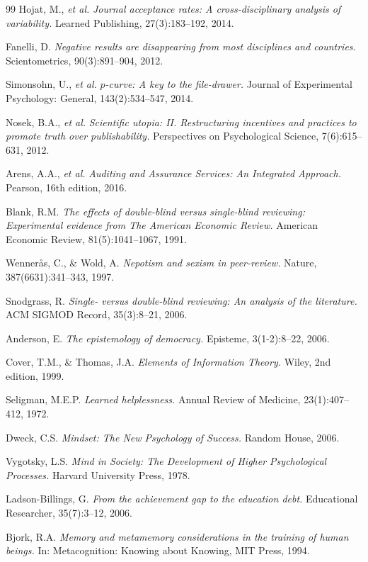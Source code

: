 \documentclass[12pt,a4paper]{article}
\theoremstyle{remark}
\begin{document}
\begin{thebibliography}{99}
Hojat, M., \textit{et al.}
\textit{Journal acceptance rates: A cross-disciplinary analysis of variability.}
Learned Publishing, 27(3):183--192, 2014.

Fanelli, D.
\textit{Negative results are disappearing from most disciplines and countries.}
Scientometrics, 90(3):891--904, 2012.

Simonsohn, U., \textit{et al.}
\textit{$p$-curve: A key to the file-drawer.}
Journal of Experimental Psychology: General, 143(2):534--547, 2014.

Nosek, B.A., \textit{et al.}
\textit{Scientific utopia: II. Restructuring incentives and practices to promote truth over publishability.}
Perspectives on Psychological Science, 7(6):615--631, 2012.

Arens, A.A., \textit{et al.}
\textit{Auditing and Assurance Services: An Integrated Approach.}
Pearson, 16th edition, 2016.

Blank, R.M.
\textit{The effects of double-blind versus single-blind reviewing: Experimental evidence from The American Economic Review.}
American Economic Review, 81(5):1041--1067, 1991.

Wenner\r{a}s, C., \& Wold, A.
\textit{Nepotism and sexism in peer-review.}
Nature, 387(6631):341--343, 1997.

Snodgrass, R.
\textit{Single- versus double-blind reviewing: An analysis of the literature.}
ACM SIGMOD Record, 35(3):8--21, 2006.

Anderson, E.
\textit{The epistemology of democracy.}
Episteme, 3(1-2):8--22, 2006.

Cover, T.M., \& Thomas, J.A.
\textit{Elements of Information Theory.}
Wiley, 2nd edition, 1999.

Seligman, M.E.P.
\textit{Learned helplessness.}
Annual Review of Medicine, 23(1):407--412, 1972.

Dweck, C.S.
\textit{Mindset: The New Psychology of Success.}
Random House, 2006.

Vygotsky, L.S.
\textit{Mind in Society: The Development of Higher Psychological Processes.}
Harvard University Press, 1978.

Ladson-Billings, G.
\textit{From the achievement gap to the education debt.}
Educational Researcher, 35(7):3--12, 2006.

Bjork, R.A.
\textit{Memory and metamemory considerations in the training of human beings.}
In: Metacognition: Knowing about Knowing, MIT Press, 1994.

\end{thebibliography}
\end{document}
